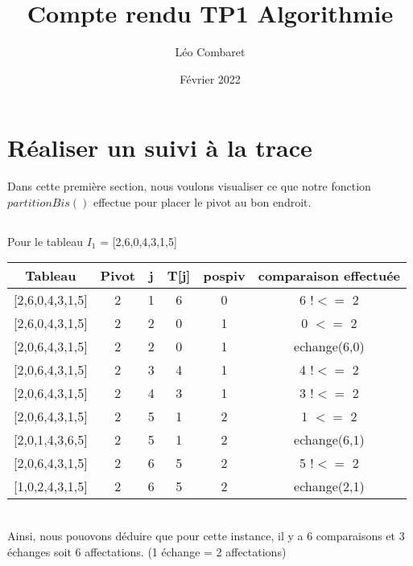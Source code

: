 \documentclass[a4paper]{article}
\title{Compte rendu TP1 Algorithmie}
\author{Léo Combaret}
\date{Février 2022}
\begin{document}
\renewcommand{\arraystretch}{1.5}
\newcommand{\HRule}{\rule{\linewidth}{0.5mm}}
\maketitle

\section{Réaliser un suivi à la trace}

Dans cette première section, nous voulons visualiser ce que notre fonction $partitionBis()$ effectue pour placer le pivot au bon endroit. \\
\subsection{}
Pour le tableau $I_{1}$ = [2,6,0,4,3,1,5] \\

 \begin{tabular}{ | c | c | c | c | c | c |}
   
   Tableau          & Pivot & j     & T[j]      & pospiv & comparaison effectuée\\
   \hline
   
   [2,6,0,4,3,1,5]  & 2     & 1     & 6         & 0      & 6 $!<=$ 2\\
   
   [2,6,0,4,3,1,5]  & 2     & 2     & 0         & 1      & 0 $<=$ 2\\
   
   [2,0,6,4,3,1,5]  & 2     & 2     & 0         & 1      & echange(6,0)\\
   
   [2,0,6,4,3,1,5]  & 2     & 3     & 4         & 1      & 4 $!<=$ 2 \\
   
   [2,0,6,4,3,1,5]  & 2     & 4     & 3         & 1      & 3 $!<=$ 2\\
   
   [2,0,6,4,3,1,5]  & 2     & 5     & 1         & 2      & 1 $<=$ 2\\
   
   [2,0,1,4,3,6,5]  & 2     & 5     & 1         & 2      & echange(6,1)\\
   
   [2,0,6,4,3,1,5]  & 2     & 6     & 5         & 2      & 5 $!<=$ 2\\
   
   [1,0,2,4,3,1,5]  & 2     & 6     & 5         & 2      & echange(2,1)\\
   
 \end{tabular}
\vspace*{5 mm}\\
Ainsi, nous pouovons déduire que pour cette instance, il y a 6 comparaisons et 3 échanges soit 6 affectations. (1 échange = 2 affectations)
\end{document}
